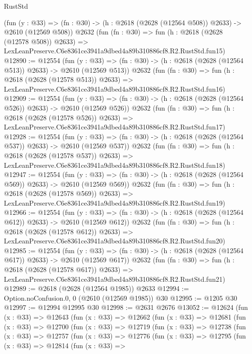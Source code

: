 \begin{lexlean}{RustStd}
\begin{coremodule}
    (fun (y : @33) => (fn : @30) -> (h : @2618 (@2628 (@12564 @508)) @2633) -> @2610 (@12569 @508))
    @2632
    (fun (fn : @30) =>
    fun (h : @2618 (@2628 (@12578 @508)) @2633) =>
    LexLeanPreserve.C6e8361ce3941a9dbed4a89b310886cf8.R2.RustStd.fun15)
@12890 := @12554
    (fun (y : @33) => (fn : @30) -> (h : @2618 (@2628 (@12564 @513)) @2633) -> @2610 (@12569 @513))
    @2632
    (fun (fn : @30) =>
    fun (h : @2618 (@2628 (@12578 @513)) @2633) =>
    LexLeanPreserve.C6e8361ce3941a9dbed4a89b310886cf8.R2.RustStd.fun16)
@12909 := @12554
    (fun (y : @33) => (fn : @30) -> (h : @2618 (@2628 (@12564 @526)) @2633) -> @2610 (@12569 @526))
    @2632
    (fun (fn : @30) =>
    fun (h : @2618 (@2628 (@12578 @526)) @2633) =>
    LexLeanPreserve.C6e8361ce3941a9dbed4a89b310886cf8.R2.RustStd.fun17)
@12928 := @12554
    (fun (y : @33) => (fn : @30) -> (h : @2618 (@2628 (@12564 @537)) @2633) -> @2610 (@12569 @537))
    @2632
    (fun (fn : @30) =>
    fun (h : @2618 (@2628 (@12578 @537)) @2633) =>
    LexLeanPreserve.C6e8361ce3941a9dbed4a89b310886cf8.R2.RustStd.fun18)
@12947 := @12554
    (fun (y : @33) => (fn : @30) -> (h : @2618 (@2628 (@12564 @569)) @2633) -> @2610 (@12569 @569))
    @2632
    (fun (fn : @30) =>
    fun (h : @2618 (@2628 (@12578 @569)) @2633) =>
    LexLeanPreserve.C6e8361ce3941a9dbed4a89b310886cf8.R2.RustStd.fun19)
@12966 := @12554
    (fun (y : @33) => (fn : @30) -> (h : @2618 (@2628 (@12564 @612)) @2633) -> @2610 (@12569 @612))
    @2632
    (fun (fn : @30) =>
    fun (h : @2618 (@2628 (@12578 @612)) @2633) =>
    LexLeanPreserve.C6e8361ce3941a9dbed4a89b310886cf8.R2.RustStd.fun20)
@12985 := @12554
    (fun (y : @33) => (fn : @30) -> (h : @2618 (@2628 (@12564 @617)) @2633) -> @2610 (@12569 @617))
    @2632
    (fun (fn : @30) =>
    fun (h : @2618 (@2628 (@12578 @617)) @2633) =>
    LexLeanPreserve.C6e8361ce3941a9dbed4a89b310886cf8.R2.RustStd.fun21)
@12989 := @2618 (@2628 (@12564 @1985)) @2633
@12994 := Option.noConfusion.{0, 0} (@2610 (@12569 @1985)) @30
@12995 := @1205 @30
@12997 := @12994 @12995 @30
@12998 := @2631 @2676
@13052 := @12624
    (fun (x : @33) =>
    @12643
      (fun (x : @33) =>
      @12662
        (fun (x : @33) =>
        @12681
          (fun (x : @33) =>
          @12700
            (fun (x : @33) =>
            @12719
              (fun (x : @33) =>
              @12738
                (fun (x : @33) =>
                @12757
                  (fun (x : @33) =>
                  @12776
                    (fun (x : @33) =>
                    @12795
                      (fun (x : @33) =>
                      @12814
                        (fun (x : @33) =>

\end{coremodule}
\end{lexlean}
